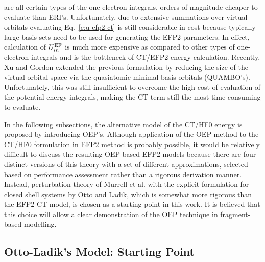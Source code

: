 \documentclass[aip,jcp,amsmath,amssymb,reprint,floatfix]{revtex4-1}
\begin{document}
are all certain types of the one\hyp{}electron integrals, orders of magnitude cheaper to
evaluate than ERI's. Unfortunately, due to extensive summations over virtual orbitals
evaluating Eq.~\eqref{e:u-efp2-ct} is still considerable in cost because typically large basis sets
need to be used for generating the EFP2 parameters. In effect, calculation of $U_{in}^{{\rm EF}}$
is much more expensive as compared to other types of one\hyp{}electron integrals
and is the bottleneck of CT/EFP2 energy calculation. Recently, Xu and Gordon
extended the previous formulation by reducing the size of the virtual orbital space
via the quasiatomic minimal\hyp{}basis orbitals (QUAMBO's).\cite{Xu.Gordon.JCP.2013} 
Unfortunately, this was still insufficient to overcome
the high cost of evaluation of the potential energy integrals, making the CT term still the most time\hyp{}consuming
to evaluate.

In the following subsections, the alternative model of the CT/HF0 energy is proposed
by introducing OEP's. Although application of the OEP method to the CT/HF0 formulation in EFP2 method
is probably possible, it would be relatively difficult to discuss the resulting OEP\hyp{}based
EFP2 models because there are four distinct versions of this theory
with a set of different approximations, selected based on performance assessment rather than 
a rigorous derivation manner.\cite{Li.Gordon.Jensen.JCP.2006}
Instead, perturbation theory of Murrell et al.\cite{Murrell.Randic.Williams.Longuet-Higgins.ProcRSocLondA.1965} 
with the
explicit formulation for closed shell systems by Otto and Ladik\cite{Otto.Ladik.ChemPhys.1975},
which is somewhat more rigorous than the EFP2 CT model,
is chosen as a starting point in this work. 
It is believed that this choice will allow a clear demonstration 
of the OEP technique in fragment\hyp{}based modelling.


\subsection{\label{ss:3.2.OL} Otto-Ladik's Model: Starting Point}
\end{document}
